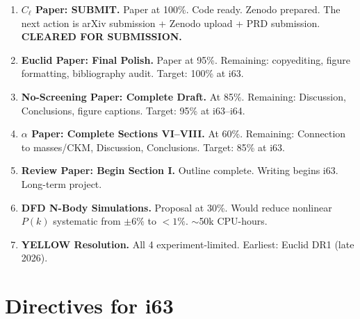 \documentclass[11pt,a4paper]{article}
\begin{document}
\begin{enumerate}[label=\textbf{P\arabic*.}]
\item \textbf{$C_\ell$ Paper: SUBMIT.} Paper at 100\%. Code ready. Zenodo prepared. The next action is arXiv submission + Zenodo upload + PRD submission. \textbf{CLEARED FOR SUBMISSION.}

\item \textbf{Euclid Paper: Final Polish.} Paper at 95\%. Remaining: copyediting, figure formatting, bibliography audit. Target: 100\% at i63.

\item \textbf{No-Screening Paper: Complete Draft.} At 85\%. Remaining: Discussion, Conclusions, figure captions. Target: 95\% at i63--i64.

\item \textbf{$\alpha$ Paper: Complete Sections VI--VIII.} At 60\%. Remaining: Connection to masses/CKM, Discussion, Conclusions. Target: 85\% at i63.

\item \textbf{Review Paper: Begin Section I.} Outline complete. Writing begins i63. Long-term project.

\item \textbf{DFD N-Body Simulations.} Proposal at 30\%. Would reduce nonlinear $P(k)$ systematic from $\pm 6\%$ to $< 1\%$. $\sim$50k CPU-hours.

\item \textbf{YELLOW Resolution.} All 4 experiment-limited. Earliest: Euclid DR1 (late 2026).
\end{enumerate}


\section{Directives for i63}
\label{sec:directives}
\end{document}
